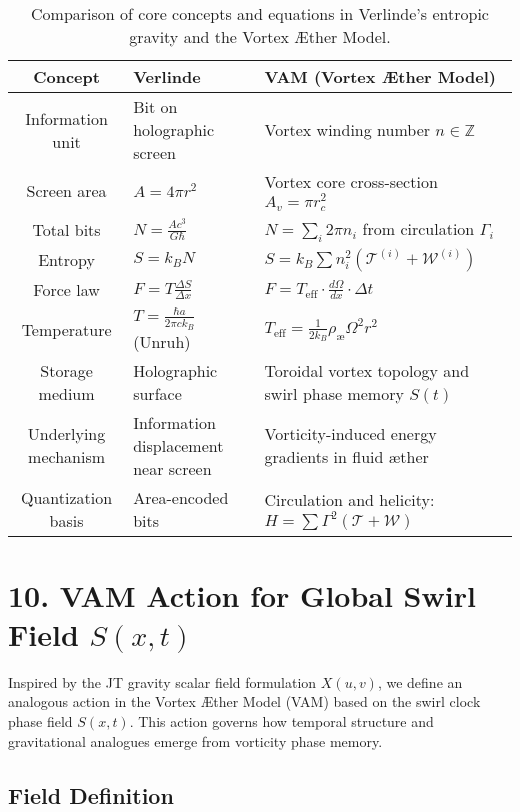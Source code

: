\documentclass[11pt]{article}
\begin{document}
\begin{table}[H]
\centering
\renewcommand{\arraystretch}{1.3}
\setlength{\tabcolsep}{10pt}
\begin{tabular}{|c|p{6.2cm}|p{6.2cm}|}
\hline
\textbf{Concept} & \textbf{Verlinde} & \textbf{VAM (Vortex \AE ther Model)} \\
\hline
Information unit & Bit on holographic screen & Vortex winding number $n \in \mathbb{Z}$ \\
\hline
Screen area & $A = 4\pi r^2$ & Vortex core cross-section $A_v = \pi r_c^2$ \\
\hline
Total bits & $N = \frac{A c^3}{G \hbar}$ & $N = \sum_i 2\pi n_i$ from circulation $\Gamma_i$ \\
\hline
Entropy & $S = k_B N$ & $S = k_B \sum n_i^2 (\mathcal{T}^{(i)} + \mathcal{W}^{(i)})$ \\
\hline
Force law & $F = T \frac{\Delta S}{\Delta x}$ & $F = T_\text{eff} \cdot \frac{d\Omega}{dx} \cdot \Delta t$ \\
\hline
Temperature & $T = \frac{\hbar a}{2\pi c k_B}$ (Unruh) & $T_\text{eff} = \frac{1}{2k_B} \rho_\text{\ae} \Omega^2 r^2$ \\
\hline
Storage medium & Holographic surface & Toroidal vortex topology and swirl phase memory $S(t)$ \\
\hline
Underlying mechanism & Information displacement near screen & Vorticity-induced energy gradients in fluid æther \\
\hline
Quantization basis & Area-encoded bits & Circulation and helicity: $H = \sum \Gamma^2(\mathcal{T} + \mathcal{W})$ \\
\hline
\end{tabular}
\caption{Comparison of core concepts and equations in Verlinde’s entropic gravity and the Vortex \AE ther Model.}
\end{table}

\section*{10. VAM Action for Global Swirl Field $S(x,t)$}

Inspired by the JT gravity scalar field formulation $X(u,v)$, we define an analogous action in the Vortex \AE ther Model (VAM) based on the swirl clock phase field $S(x,t)$. This action governs how temporal structure and gravitational analogues emerge from vorticity phase memory.

\subsection*{Field Definition}
\end{document}
